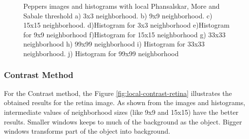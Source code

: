 \documentclass[]{IEEEtran}
\begin{document}
\begin{figure}[h]
  \caption{Peppers images and histograms with local Phansalskar, More and Sabale threshold a) 3x3 neighborhood. b) 9x9 neighborhood. c) 15x15 neighborhood. d)Histogram for 3x3 neighborhood e)Histogram for 9x9 neighborhood f)Histogram for 15x15 neighborhood g) 33x33 neighborhood h) 99x99 neighborhood i) Histogram for 33x33 neighborhood. j) Histogram for 99x99 neighborhood}
  \label{fig:local-more-peppers}
\end{figure}

\subsubsection{Contrast Method}
For the Contrast method, the Figure \ref{fig:local-contrast-retina} illustrates the obtained results for the retina image. As shown from the images and histograms, intermediate values of neighborhood sizes (like 9x9 and 15x15) have the better results. Smaller windows keeps to much of the background as the object. Bigger windows transforms part of the object into background. 
\end{document}
